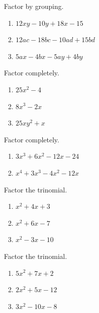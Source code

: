 \documentclass[
  en,11pt]{elegantbook}
\let\BeginKnitrBlock\begin \let\EndKnitrBlock\end
\begin{document}
\BeginKnitrBlock{exercise}
\protect\hypertarget{exr:unnamed-chunk-26}{}{\label{exr:unnamed-chunk-26} }
Factor by grouping.

\begin{enumerate}
\def\labelenumi{\arabic{enumi}.}

\item
  \(12xy-10y+18x-15\)
\item
  \(12ac-18bc-10ad+15bd\)
\item
  \(5ax-4bx-5ay+4by\)
\end{enumerate}
\EndKnitrBlock{exercise}

\BeginKnitrBlock{exercise}
\protect\hypertarget{exr:unnamed-chunk-27}{}{\label{exr:unnamed-chunk-27} }
Factor completely.

\begin{enumerate}
\def\labelenumi{\arabic{enumi}.}

\item
  \(25x^2-4\)
\item
  \(8x^3-2x\)
\item
  \(25xy^2+x\)
\end{enumerate}
\EndKnitrBlock{exercise}

\BeginKnitrBlock{exercise}
\protect\hypertarget{exr:unnamed-chunk-28}{}{\label{exr:unnamed-chunk-28} }
Factor completely.

\begin{enumerate}
\def\labelenumi{\arabic{enumi}.}

\item
  \(3x^3+6x^2-12x-24\)
\item
  \(x^4+3x^3-4x^2-12x\)
\end{enumerate}
\EndKnitrBlock{exercise}

\BeginKnitrBlock{exercise}
\protect\hypertarget{exr:unnamed-chunk-29}{}{\label{exr:unnamed-chunk-29} }
Factor the trinomial.

\begin{enumerate}
\def\labelenumi{\arabic{enumi}.}

\item
  \(x^2+4x+3\)
\item
  \(x^2+6x-7\)
\item
  \(x^2-3x-10\)
\end{enumerate}
\EndKnitrBlock{exercise}

\BeginKnitrBlock{exercise}
\protect\hypertarget{exr:unnamed-chunk-30}{}{\label{exr:unnamed-chunk-30} }
Factor the trinomial.

\begin{enumerate}
\def\labelenumi{\arabic{enumi}.}

\item
  \(5x^2+7x+2\)
\item
  \(2x^2+5x-12\)
\item
  \(3x^2-10x-8\)
\end{enumerate}
\EndKnitrBlock{exercise}
\end{document}
